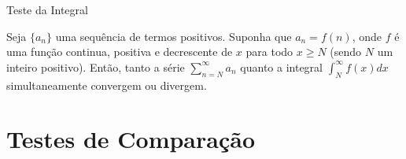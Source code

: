 \documentclass[hyperref={pdfpagelabels=false}]{beamer}
\begin{document}
\begin{frame}{Teste da Integral}
    \begin{theorem}
        Seja $\{a_n\}$ uma sequência de termos positivos. Suponha que $a_n = f(n)$, onde $f$ é uma função continua, positiva e decrescente de $x$ para todo $x \geq N$ (sendo $N$ um inteiro positivo). Então, tanto a série $\displaystyle \sum_{n=N}^{\infty}a_n$ quanto a integral $\displaystyle \int_N^{\infty}f(x)dx$ simultaneamente convergem ou divergem.
    \end{theorem}

\end{frame}

\section{Testes de Comparação}
\end{document}

